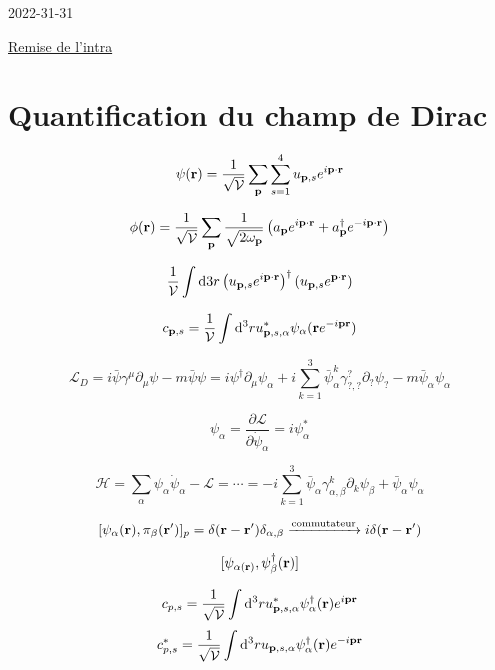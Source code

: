 


2022-31-31

\underline{Remise de l'intra} 

\section*{Quantification du champ de Dirac}


\[ \psi(\vb{r}) = \frac{1}{\sqrt{\mathcal{V}}} \sum_{\vb{p}} \sum_{s=1}^{4} u_{\vb{p},s} e^{i\vb{p}\cdot \vb{r}} \] 


\begin{tcolorbox}[title=Retour sur le champ scalaire]
	\[ \phi(\vb{r}) = \frac{1}{\sqrt{\mathcal{V}}} \sum_{\vb{p}} \frac{1}{\sqrt{2\omega_{\vb{p}} }}\left( a_{\vb{p}} e^{i \vb{p} \cdot  \vb{r}}  + a_{\vb{p}}^{\dagger} e^{-i\vb{p} \cdot \vb{r}} \right) \] 
\end{tcolorbox}


\[ \frac{1}{\mathcal{V}} \int \dd 3 r \left( u_{\vb{p},s} e^{i\vb{p}\cdot \vb{r}} \right)^{\dagger} \left( u_{\vb{p},s} e^{\vb{p}\cdot \vb{r}} \right)  \] 

\[ c_{\vb{p},s} = \frac{1}{\mathcal{V}} \int \dd^{3}r u_{\vb{p},s,\alpha} ^{*} \psi_\alpha(\vb{r} e^{-i\vb{p}\vb{r}})  \] 

\[ \mathscr{L}_D = i \bar \psi \gamma^{\mu} \partial_{\mu} \psi - m \bar\psi \psi = i \psi^{\dagger}\partial_{\mu}\psi_{\alpha} + i \sum_{k=1}^{3} \bar\psi_{\alpha}^{k}\gamma_{?,?}^{?}\partial_? \psi_? - m \bar \psi_{\alpha} \psi_{\alpha}  \] 

\[ \psi_{\alpha} = \frac{\partial {\mathscr{L} }}{\partial {\dot \psi_\alpha}} = i\psi_{\alpha}^{*}\] 

\[ \mathscr{H} = \sum_{\alpha} \psi_{\alpha} \dot\psi_{\alpha} - \mathscr{L} = \dotsb = -i \sum_{k=1}^{3} \bar \psi_{\alpha} \gamma_{\alpha,\beta}^{k} \partial_k \psi_{\beta} + \bar\psi_{\alpha} \psi_\alpha  \] 


\[ [\psi_{\alpha}(\vb{r}), \pi_{\beta}(\vb{r}')]_p = \delta(\vb{r}-\vb{r}') \delta_{\alpha,\beta} \xrightarrow{\text{commutateur}} i\delta(\vb{r}-\vb{r}')\]  

\[ [\psi_{\alpha(\vb{r})}, \psi_\beta^{\dagger}(\vb{r})]  \] 

\[ c_{p,s} = \frac{1}{\sqrt{\mathcal{V} } } \int \dd^{3}r u_{\vb{p},s,\alpha}^{*} \psi_\alpha^{\dagger}	(\vb{r}) e^{i\vb{p}\vb{r}}\] 
\[ c_{p,s}^{*} = \frac{1}{\sqrt{\mathcal{V} } } \int \dd^{3}r u_{\vb{p},s,\alpha} \psi_\alpha^{\dagger}	(\vb{r}) e^{-i\vb{p}\vb{r}}\] 


